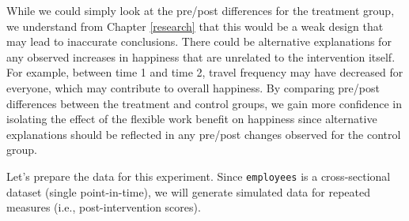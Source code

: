 \documentclass[
]{book}
\begin{document}
While we could simply look at the pre/post differences for the treatment group, we understand from Chapter \ref{research} that this would be a weak design that may lead to inaccurate conclusions. There could be alternative explanations for any observed increases in happiness that are unrelated to the intervention itself. For example, between time 1 and time 2, travel frequency may have decreased for everyone, which may contribute to overall happiness. By comparing pre/post differences between the treatment and control groups, we gain more confidence in isolating the effect of the flexible work benefit on happiness since alternative explanations should be reflected in any pre/post changes observed for the control group.

Let's prepare the data for this experiment. Since \texttt{employees} is a cross-sectional dataset (single point-in-time), we will generate simulated data for repeated measures (i.e., post-intervention scores).
\end{document}
